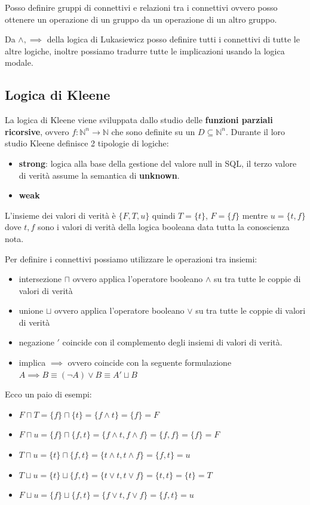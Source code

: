 Posso definire gruppi di connettivi e relazioni tra i connettivi ovvero posso ottenere 
un operazione di un gruppo da un operazione di un altro gruppo.

Da $\land,\implies$ della logica di Lukasiewicz posso definire tutti i connettivi 
di tutte le altre logiche, inoltre possiamo tradurre tutte le implicazioni usando 
la logica modale.


\subsection{Logica di Kleene}
La logica di Kleene viene sviluppata dallo studio delle \textbf{funzioni parziali ricorsive},
ovvero $f:\mathbb{N}^n\to \mathbb{N}$ che sono definite su un $D\subseteq \mathbb{N}^n$.
Durante il loro studio Kleene definisce 2 tipologie di logiche:
\begin{itemize}
    \item \textbf{strong}: logica alla base della gestione del valore null in SQL,
    il terzo valore di verità assume la semantica di \textbf{unknown}.
    \item \textbf{weak}
\end{itemize} 

L'insieme dei valori di verità è $\{F,T,u\}$  quindi $T=\{t\}$, $F=\{f\}$
mentre $u=\{t,f\}$ dove $t,f$ sono i valori di verità della logica booleana data 
tutta la conoscienza nota.

Per definire i connettivi possiamo utilizzare le operazioni tra insiemi:
\begin{itemize}
    \item intersezione $\sqcap$ ovvero applica l'operatore booleano $\land$ su 
    tra tutte le coppie di valori di verità
    \item unione $\sqcup$ ovvero applica l'operatore booleano $\lor$ su 
    tra tutte le coppie di valori di verità
    \item negazione $'$ coincide con il complemento degli insiemi di valori di verità.
    \item implica $\implies$ ovvero coincide con la seguente formulazione 
    $A \implies B \equiv (\lnot A) \lor B \equiv A' \sqcup B $
\end{itemize}

\begin{esempio}
    Ecco un paio di esempi:
    \begin{itemize}
        \item $F\sqcap T = \{f\} \sqcap \{t\} = \{f\land t\} = \{f\} = F$ 
        \item $F\sqcap u = \{f\} \sqcap \{f,t\} = \{f\land t, f\land f\} = \{f, f\} =\{f\}= F$
        \item $T\sqcap u = \{t\} \sqcap \{f,t\} = \{t\land t, t\land f\} = \{f,t\} = u$
        \item $T\sqcup u = \{t\} \sqcup \{f,t\} = \{t\lor t, t\lor f\} = \{t,t\}= \{t\}= T$
        \item $F\sqcup u = \{f\} \sqcup \{f,t\} = \{f\lor t, f\lor f\} = \{f,t\}= u$
    \end{itemize}
\end{esempio}

